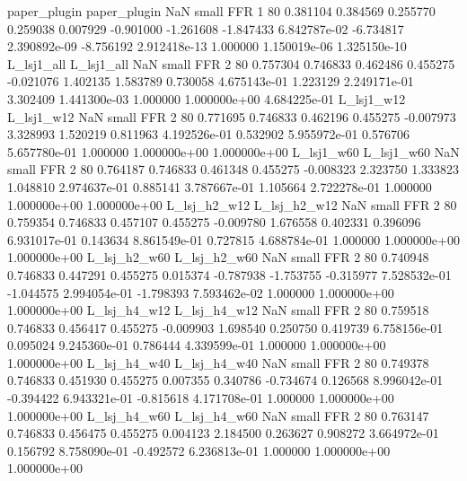   paper_plugin   paper_plugin                   NaN      small      FFR                 1 80 0.381104       0.384569 0.255770       0.259038    0.007929     -0.901000     -1.261608    -1.847433   6.842787e-02 -6.734817 2.390892e-09    -8.756192   2.912418e-13            1.000000    1.150019e-06        1.325150e-10
    L_lsj1_all     L_lsj1_all                   NaN      small      FFR                 2 80 0.757304       0.746833 0.462486       0.455275   -0.021076      1.402135      1.583789     0.730058   4.675143e-01  1.223129 2.249171e-01     3.302409   1.441300e-03            1.000000    1.000000e+00        4.684225e-01
    L_lsj1_w12     L_lsj1_w12                   NaN      small      FFR                 2 80 0.771695       0.746833 0.462196       0.455275   -0.007973      3.328993      1.520219     0.811963   4.192526e-01  0.532902 5.955972e-01     0.576706   5.657780e-01            1.000000    1.000000e+00        1.000000e+00
    L_lsj1_w60     L_lsj1_w60                   NaN      small      FFR                 2 80 0.764187       0.746833 0.461348       0.455275   -0.008323      2.323750      1.333823     1.048810   2.974637e-01  0.885141 3.787667e-01     1.105664   2.722278e-01            1.000000    1.000000e+00        1.000000e+00
  L_lsj_h2_w12   L_lsj_h2_w12                   NaN      small      FFR                 2 80 0.759354       0.746833 0.457107       0.455275   -0.009780      1.676558      0.402331     0.396096   6.931017e-01  0.143634 8.861549e-01     0.727815   4.688784e-01            1.000000    1.000000e+00        1.000000e+00
  L_lsj_h2_w60   L_lsj_h2_w60                   NaN      small      FFR                 2 80 0.740948       0.746833 0.447291       0.455275    0.015374     -0.787938     -1.753755    -0.315977   7.528532e-01 -1.044575 2.994054e-01    -1.798393   7.593462e-02            1.000000    1.000000e+00        1.000000e+00
  L_lsj_h4_w12   L_lsj_h4_w12                   NaN      small      FFR                 2 80 0.759518       0.746833 0.456417       0.455275   -0.009903      1.698540      0.250750     0.419739   6.758156e-01  0.095024 9.245360e-01     0.786444   4.339599e-01            1.000000    1.000000e+00        1.000000e+00
  L_lsj_h4_w40   L_lsj_h4_w40                   NaN      small      FFR                 2 80 0.749378       0.746833 0.451930       0.455275    0.007355      0.340786     -0.734674     0.126568   8.996042e-01 -0.394422 6.943321e-01    -0.815618   4.171708e-01            1.000000    1.000000e+00        1.000000e+00
  L_lsj_h4_w60   L_lsj_h4_w60                   NaN      small      FFR                 2 80 0.763147       0.746833 0.456475       0.455275    0.004123      2.184500      0.263627     0.908272   3.664972e-01  0.156792 8.758090e-01    -0.492572   6.236813e-01            1.000000    1.000000e+00        1.000000e+00
